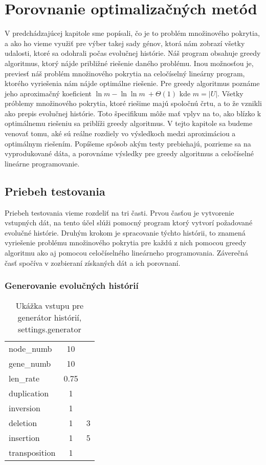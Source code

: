 \chapter{Porovnanie optimalizačných metód}
V predchádzajúcej kapitole sme popísali, čo je to problém množinového pokrytia, a
ako ho vieme využiť pre výber takej sady génov, ktorá nám zobrazí všetky udalosti, ktoré sa odohrali počas evolučnej histórie.
Náš program obsahuje greedy algoritmus, ktorý nájde približné riešenie daného problému.
Inou možnosťou je, previesť náš problém množinového pokrytia na celočíselný lineárny program, ktorého vyriešenia nám nájde optimálne riešenie.
Pre greedy algoritmus poznáme jeho aproximačný koeficient \(\ln m - \ln \ln m\ +\Theta(1) \) \cite{Slavik} 
kde \(m = |U|\). 
Všetky próblemy množinového pokrytia, ktoré riešime majú spoločnú črtu, a to že vznikli ako prepis evolučnej histórie.
Toto špecifikum môže mať vplyv na to, ako blízko k optimálnemu riešeniu sa priblíži greedy algoritmus.
V tejto kapitole sa budeme venovať tomu, aké sú reálne rozdiely vo výsledkoch medzi aproximáciou a optimálnym riešením.
Popíšeme spôsob akým testy prebiehajú, pozrieme sa na vyprodukované dáta, a porovnáme výsledky pre greedy algoritmus a celočíselné lineárne programovanie.

\section{Priebeh testovania}
Priebeh testovania vieme rozdeliť na tri časti. 
Prvou časťou je vytvorenie vstupných dát, na tento účel slúži pomocný program ktorý vytvorí požadované evolučné histórie.
Druhým krokom je spracovanie týchto histórii, to znamená vyriešenie problému množinového pokrytia pre každú z nich pomocou 
greedy algoritmu ako aj pomocou celočíselného lineárneho programovania. Záverečná časť spočíva v zozbieraní získaných dát a ich porovnaní.
\subsection{Generovanie evolučných histórií}
\label{sub:generovanie}

\begin{table}[!htb]
\label{tab:generator}
\begin{center}
\begin{tabular}{lcl}
node\_numb & 10 & \\
gene\_numb & 10 & \\
len\_rate & 0.75 & \\
duplication & 1 & \\ 
inversion & 1 & \\ 
deletion & 1 & 3 \\ 
insertion & 1 & 5 \\ 
transposition & 1 & \\
\end{tabular}
\end{center}
\caption{Ukážka vstupu pre generátor histórií, settings.generator}
\end{table}

